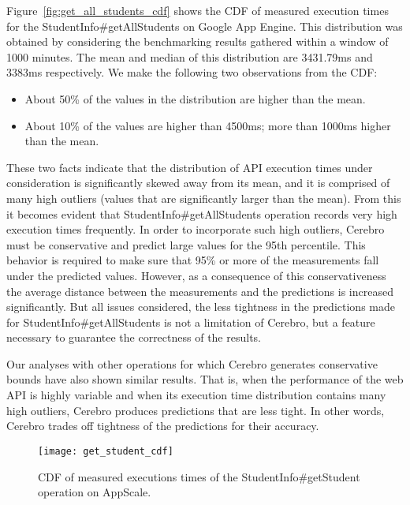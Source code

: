 Figure~\ref{fig:get_all_students_cdf} shows the CDF of measured execution times for the StudentInfo\#getAllStudents on Google
App Engine. This distribution was obtained by considering the benchmarking results gathered within a window of 1000 minutes. 
The mean and median of this distribution are 3431.79ms and 3383ms respectively. We make the following two observations from the
CDF:

\begin{itemize}
\item About 50\% of the values in the distribution are higher than the mean.
\item About 10\% of the values are higher than 4500ms; more than 1000ms higher than the mean.
\end{itemize}

These two facts indicate that the distribution of API execution times under consideration is significantly skewed away from its 
mean, and it is comprised of many high outliers (values that are significantly larger than the mean).
From this it becomes evident that StudentInfo\#getAllStudents operation records very high execution times frequently. 
In order to incorporate such high outliers, Cerebro must be conservative and predict large values for
the 95th percentile. This behavior is required to make sure that 95\% or more of the measurements fall under the
predicted values. However, as a consequence of this conservativeness the average distance between the measurements and 
the predictions is increased significantly. But all issues considered, the less tightness in the predictions made for StudentInfo\#getAllStudents
is not a limitation of Cerebro, but a feature necessary to guarantee the correctness of the results.

Our analyses with other operations for which
Cerebro generates conservative bounds have also shown similar results. That is, when the performance of the web API is highly variable and
when its execution time distribution contains
many high outliers, Cerebro produces predictions that are less tight. In other words, Cerebro trades off tightness of the predictions 
for their accuracy.

\begin{figure}
\centering
\texttt{[image: get\_student\_cdf]}
\caption{CDF of measured executions times of the StudentInfo\#getStudent operation on AppScale.}
\label{fig:get_student_cdf}
\end{figure}

